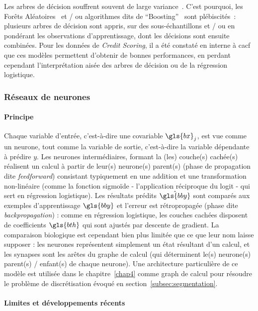 Les arbres de décision souffrent souvent de large variance~\cite{geurts2000investigation}. C'est pourquoi, les Forêts Aléatoires~\cite{breiman2001random} et / ou algorithmes dits de ``Boosting''~\cite{zhou2012ensemble} sont plébiscités~: plusieurs arbres de décision sont appris, sur des sous-échantillons et / ou en pondérant les observations d'apprentissage, dont les décisions sont ensuite combinées. Pour les données de \textit{Credit Scoring}, il a été constaté en interne à \gls{cacf} que ces modèles permettent d'obtenir de bonnes performances, en perdant cependant l'interprétation aisée des arbres de décision ou de la régression logistique.

\subsubsection{Réseaux de neurones}

\paragraph{Principe}

Chaque variable d'entrée, c'est-à-dire une covariable $\gls{bx}_j$, est vue comme un neurone, tout comme la variable de sortie, c'est-à-dire la variable dépendante à prédire $y$. Les neurones intermédiaires, formant la (les) couche(s) cachée(s) réalisent un calcul à partir de leur(s) neurone(s) parent(s) (phase de propagation dite \textit{feedforward}) consistant typiquement en une addition et une transformation non-linéaire (comme la fonction  sigmoïde - l'application réciproque du logit - qui sert en régression logistique). Les résultats prédits $\hat{\gls{bby}}$ sont comparés aux exemples d'apprentissage $\gls{bby}$ et l'erreur est rétropropagée (phase dite \textit{backpropagation}) : comme en régression logistique, les couches cachées disposent de coefficients $\gls{bth}$ qui sont ajustés par descente de gradient. La comparaison biologique est cependant bien plus limitée que ce que leur nom laisse supposer : les neurones représentent simplement un état résultant d'un calcul, et les synapses sont les arêtes du graphe de calcul (qui déterminent le(s) neurone(s) parent(s) / enfant(s) de chaque neurone). Une architecture particulière de ce modèle est utilisée dans le chapitre~\ref{chap4} comme graph de calcul pour résoudre le problème de discrétisation évoqué en section~\ref{subsec:segmentation}.

\paragraph{Limites et développements récents}

